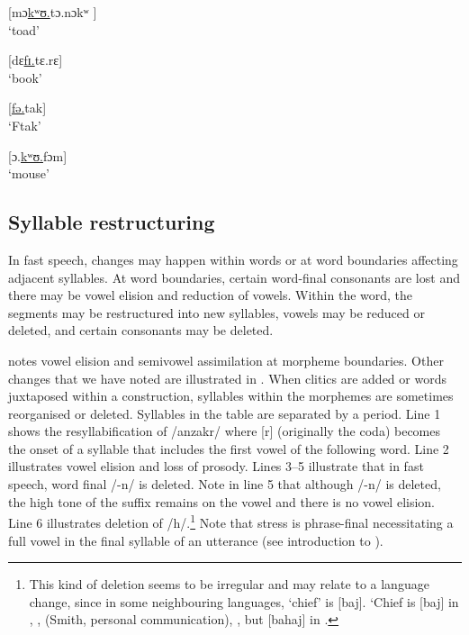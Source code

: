 \ea \label{ex:2:60}
\textup{[}\textup{mɔ}\underline{\textup{kʷʊ.}}\textup{tɔ.nɔkʷ}\textup{ ]}\\
\glt  ‘toad’
\z

\ea \label{ex:2:61}
\textup{[dɛ}\underline{\textup{fɪ.}}\textup{tɛ.rɛ}\textup{]}\\
\glt  ‘book’
\z

\ea \label{ex:2:62}
\textup{[}\underline{\textup{fə.}}\textup{tak}\textup{]}\\
\glt  ‘Ftak’
\z

\ea \label{ex:2:63}
[ɔ.\underline{kʷʊ.}fɔm]\\
\glt  ‘mouse’
\z

\subsection{Syllable restructuring}\label{sec:2.5.2}
\hypertarget{RefHeading1210721525720847}{}
In fast speech, changes may happen within words or at word boundaries affecting adjacent syllables. At word boundaries, certain word-final consonants are lost and there may be vowel elision and reduction of vowels. Within the word, the segments may be restructured into new syllables, vowels may be reduced or deleted, and certain consonants may be deleted.

\citet{Bow1997c} notes vowel elision and semivowel assimilation at morpheme boundaries. Other changes that we have noted are illustrated in . When clitics are added or words juxtaposed within a construction, syllables within the morphemes are sometimes reorganised or deleted. Syllables in the table are separated by a period. Line 1 shows the resyllabification of /anzakr/ where [r] (originally the coda) becomes the onset of a syllable that includes the first vowel of the following word. Line 2 illustrates vowel elision and loss of prosody. Lines 3--5 illustrate that in fast speech, word final /-n/ is deleted. Note in line 5 that although /-n/ is deleted, the high tone of the suffix remains on the vowel and there is no vowel elision. Line 6 illustrates deletion of /h/.\footnote{This kind of deletion seems to be irregular and may relate to a language change, since in some neighbouring languages, ‘chief’ is [baj]. ‘Chief is [baj] in  \citep[120]{Ndokobai2006},  \citep[9]{Gravina2005},  (Smith, personal communication),  \citep[17]{Kinnaird2006}, but [bahaj] in  \citep[9]{Gravina2001}.} Note that stress is phrase-final necessitating a full vowel in the final syllable of an utterance (see introduction to ).

